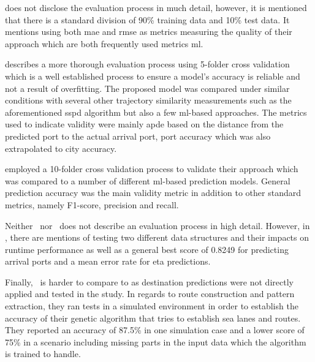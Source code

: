\cite{lechtenberg2019} does not disclose the evaluation process in much detail, however, it is mentioned that there is a standard division of 90\% training data and 10\% test data. It mentions using both \acrshort{mae} and \acrshort{rmse} as metrics measuring the quality of their approach which are both frequently used metrics \acrshort{ml}.

\cite{Zhang2020AISApproach} describes a more thorough evaluation process using 5-folder cross validation which is a well established process to ensure a model's accuracy is reliable and not a result of overfitting. The proposed model was compared under similar conditions with several other trajectory similarity measurements such as the aforementioned \acrshort{sspd} algorithm but also a few \acrshort{ml}-based approaches. The metrics used to indicate validity were mainly \acrfull{apde} based on the distance from the predicted port to the actual arrival port, port accuracy which was also extrapolated to city accuracy.

\cite{Karatas2020TrajectoryData} employed a 10-folder cross validation process to validate their approach which was compared to a number of different \acrshort{ml}-based prediction models. General prediction accuracy was the main validity metric in addition to other standard metrics, namely F1-score, precision and recall.

Neither~\cite{Bachar2018GrandDestination} nor~\cite{Rosca2018GrandRoutes} does not describe an evaluation process in high detail. However, in \cite{Rosca2018GrandRoutes}, there are mentions of testing two different data structures and their impacts on runtime performance as well as a general best score of 0.8249 for predicting arrival ports and a mean error rate for \acrshort{eta} predictions.

Finally,~\cite{Dobrkovic2018MaritimeData} is harder to compare to as destination predictions were not directly applied and tested in the study. In regards to route construction and pattern extraction, they ran tests in a simulated environment in order to establish the accuracy of their genetic algorithm that tries to establish sea lanes and routes. They reported an accuracy of 87.5\% in one simulation case and a lower score of 75\% in a scenario including missing parts in the input data which the algorithm is trained to handle.


